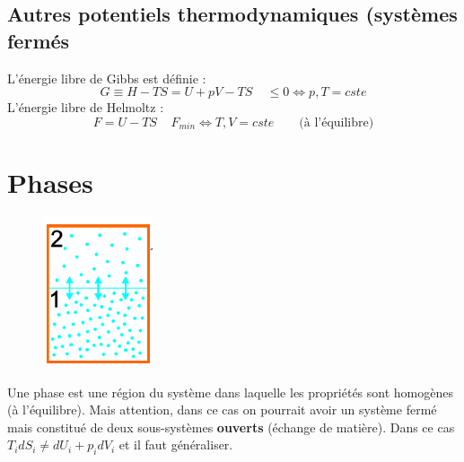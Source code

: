 \documentclass[11pt, a4paper, openany]{book}
\begin{document}
		
		\subsection{Autres potentiels thermodynamiques (systèmes fermés}
		L'énergie libre de Gibbs est définie : 
		\begin{equation}
			G \equiv H - TS = U + pV - TS\ \ \ \ \ \leq 0 \Leftrightarrow p, T = cste
		\end{equation}
		L'énergie libre de Helmoltz :
		\begin{equation}
			F = U - TS\ \ \ \ \ F_{min} \Leftrightarrow T, V = cste\qquad\text{(à l'équilibre)}
		\end{equation}
		
		\section{Phases}
		\begin{figure}
			\includegraphics[scale=0.4]{cp/image4.png}
		\end{figure}
		Une phase est une région du système dans laquelle les propriétés sont homogènes (à l'équilibre). Mais attention, dans ce cas on pourrait avoir un système fermé mais constitué de deux sous-systèmes \textbf{ouverts } (échange de matière). Dans ce cas $T_idS_i \neq dU_i + p_idV_i$ et il faut généraliser.
		
\end{document}
